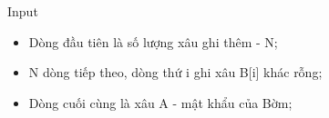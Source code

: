 Input
\begin{itemize}
	\item     Dòng đầu tiên là số lượng xâu ghi thêm - N;   
	\item     N dòng tiếp theo, dòng thứ i ghi xâu B[i] khác rỗng;   
	\item     Dòng cuối cùng là xâu A - mật khẩu của Bờm;   
\end{itemize}